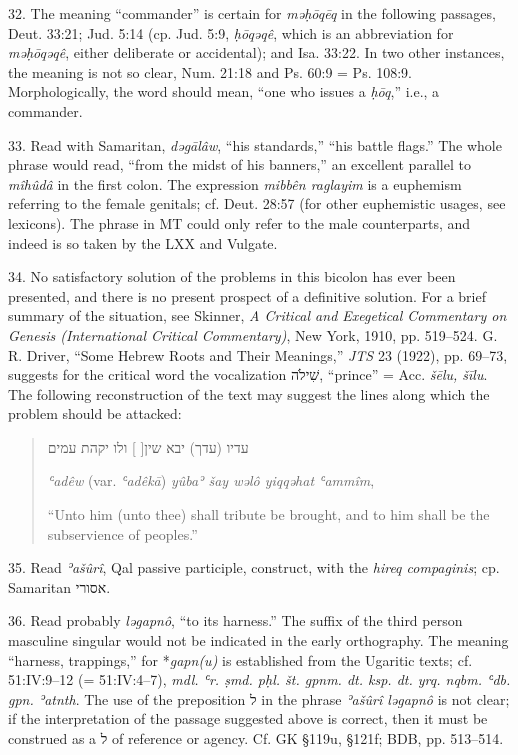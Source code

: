 \begin{enumerate}
32. The meaning ``commander'' is certain for \emph{məḥōqēq} in the following
passages, Deut. 33:21; Jud. 5:14 (cp. Jud. 5:9, \emph{ḥōqəqê}, which is an
abbreviation for \emph{məḥōqəqê}, either deliberate or accidental); and
Isa. 33:22. In two other instances, the meaning is not so clear, Num. 21:18 and
Ps. 60:9 = Ps. 108:9. Morphologically, the word should mean, ``one who issues a
\emph{ḥōq},'' i.e., a commander.

33. Read with Samaritan, \emph{dəgālâw}, ``his standards,'' ``his battle
flags.'' The whole phrase would read, ``from the midst of his banners,'' an
excellent parallel to \emph{mîhûdâ} in the first colon. The expression
\emph{mibbên raglayim} is a euphemism referring to the female genitals; cf.
Deut. 28:57 (for other euphemistic usages, see lexicons). The phrase in MT
could only refer to the male counterparts, and indeed is so taken by the LXX
and Vulgate.

34. No satisfactory solution of the problems in this bicolon has ever been
presented, and there is no present prospect of a definitive solution. For a
brief summary of the situation, see Skinner, \emph{A Critical and Exegetical
Commentary on Genesis (International Critical Commentary)}, New York, 1910,
pp. 519--524. G. R. Driver, ``Some Hebrew Roots and Their Meanings,'' \emph{JTS}
23 (1922), pp. 69--73, suggests for the critical word the vocalization
שִׁילֹה, ``prince'' = Acc. \emph{šēlu, šīlu}. The following reconstruction
of the text may suggest the lines along which the problem should be attacked:

\begin{quote}
עדיו (עדך) יבא שין[ ] ולו יקהת עמים

\emph{ʿadêw} (var. \emph{ʿadêkā}) \emph{yûbaʾ šay wəlô yiqqəhat ʿammîm},

``Unto him (unto thee) shall tribute be brought, and to him shall be the
subservience of peoples.''
\end{quote}

35. Read \emph{ʾašûrî}, Qal passive participle, construct, with the
\emph{hireq compaginis}; cp. Samaritan אסורי.

36. Read probably \emph{ləgapnô}, ``to its harness.'' The suffix of the third
person masculine singular would not be indicated in the early orthography.
The meaning ``harness, trappings,'' for *\emph{gapn(u)} is established from
the Ugaritic texts; cf. 51:IV:9--12 (= 51:IV:4--7),
\emph{mdl. ʿr. ṣmd. pḥl. št. gpnm. dt. ksp. dt. yrq. nqbm. ʿdb. gpn.
ʾatnth}. The use of the preposition ל in the phrase \emph{ʾašûrî ləgapnô} is
not clear; if the interpretation of the passage suggested above is correct,
then it must be construed as a ל of reference or agency. Cf. GK §119u, §121f;
BDB, pp. 513--514.


\end{enumerate}
